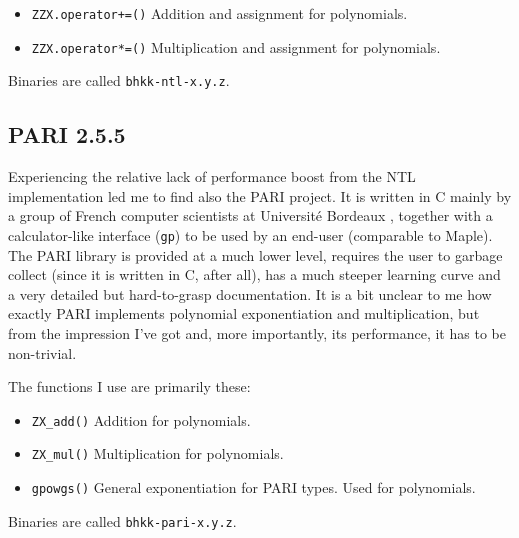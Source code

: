 \documentclass[a4paper]{article}
\newcommand{\code}{\texttt}
\begin{document}
\begin{itemize}
 \item \code{ZZX.operator+=()}
 \subitem Addition and assignment for polynomials. %
 \item \code{ZZX.operator*=()}
 \subitem Multiplication and assignment for polynomials. %
\end{itemize}

Binaries are called \code{bhkk-ntl-x.y.z}.

\subsection{PARI 2.5.5}
Experiencing the relative lack of performance boost from the NTL implementation led me to find also the PARI project. It is written in C mainly by a group of French computer scientists at Université Bordeaux \cite{pari}, together with a calculator-like interface (\code{gp}) to be used by an end-user (comparable to Maple). The PARI library is provided at a much lower level, requires the user to garbage collect (since it is written in C, after all), has a much steeper learning curve and a very detailed but hard-to-grasp documentation. It is a bit unclear to me how exactly PARI implements polynomial exponentiation and multiplication, but from the impression I've got and, more importantly, its performance, it has to be non-trivial.

The functions I use are primarily these: 

\begin{itemize}
 \item \code{ZX\_add()}
 \subitem Addition for polynomials. %
 \item \code{ZX\_mul()}
 \subitem Multiplication for polynomials. %
 \item \code{gpowgs()}
 \subitem General exponentiation for PARI types. Used for polynomials.
\end{itemize}

Binaries are called \code{bhkk-pari-x.y.z}.


\end{document}
